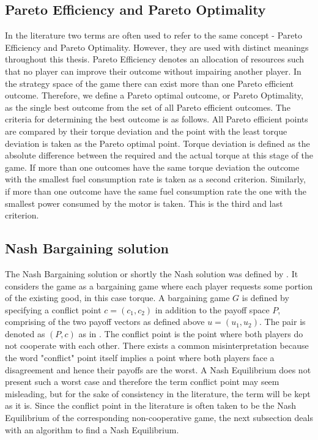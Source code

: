 {\subsection{Pareto Efficiency and Pareto Optimality}
In the literature two terms are often used to refer to the same concept - Pareto Efficiency and Pareto Optimality. However, they are used with distinct meanings throughout this thesis. Pareto Efficiency denotes an allocation of resources such that no player can improve their outcome without impairing another player. In the strategy space of the game there can exist more than one Pareto efficient outcome. Therefore, we define a Pareto optimal outcome, or Pareto Optimality, as the single best outcome from the set of all Pareto efficient outcomes. The criteria for determining the best outcome is as follows. All Pareto efficient points are compared by their torque deviation and the point with the least torque deviation is taken as the Pareto optimal point. Torque deviation is defined as the absolute difference between the required and the actual torque at this stage of the game. If more than one outcomes have the same torque deviation the outcome with the smallest fuel consumption rate is taken as a second criterion. Similarly, if more than one outcome have the same fuel consumption rate the one with the smallest power consumed by the motor is taken. This is the third and last criterion.

\subsection{Nash Bargaining solution}
The Nash Bargaining solution or shortly the Nash solution was defined by \citet{nash1950bargaining}. It considers the game as a bargaining game where each player requests some portion of the existing good, in this case torque. A bargaining game $G$ is defined by specifying a conflict point $c = (c_1,c_2)$ in addition to the payoff space $P$, comprising of the two payoff vectors as defined above $u = (u_1,u_2)$. The pair is denoted as $(P,c)$ as in \citet{holler2006einfuhrung}. The conflict point is the point where both players do not cooperate with each other. There exists a common misinterpretation because the word "conflict" point itself implies a point where both players face a disagreement and hence their payoffs are the worst. A Nash Equilibrium does not present such a worst case and therefore the term conflict point may seem misleading, but for the sake of consistency in the literature, the term will be kept as it is. Since the conflict point in the literature is often taken to be the Nash Equilibrium of the corresponding non-cooperative game, the next subsection deals with an algorithm to find a Nash Equilibrium.

}
